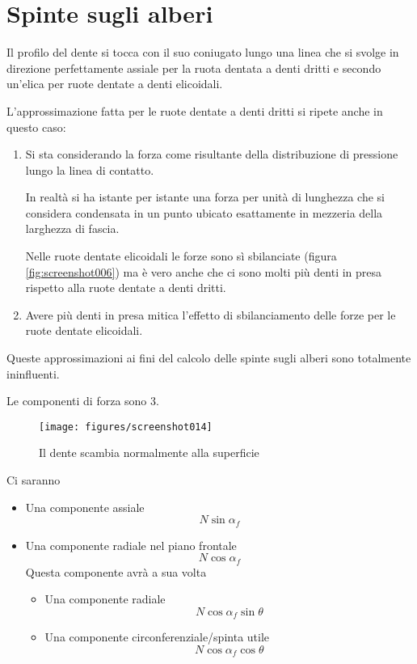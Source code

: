 \documentclass[a4paper, 15pt]{article}
\begin{document}
\section{Spinte sugli alberi}
\begin{adjustwidth}{2in}{}	
	Il profilo del dente si tocca con il suo coniugato lungo una linea che si svolge in direzione perfettamente assiale per la ruota dentata a denti dritti e secondo un'elica per ruote dentate a denti elicoidali. 
	
	L'approssimazione fatta per le ruote dentate a denti dritti si ripete anche in questo caso:
	\begin{enumerate}
		\item Si sta considerando la forza come risultante della distribuzione di pressione lungo la linea di contatto.
		
		In realtà si ha istante per istante una forza per unità di lunghezza che si considera condensata in un punto ubicato esattamente in mezzeria della larghezza di fascia. \newline 
		
		Nelle ruote dentate elicoidali le forze sono sì sbilanciate (figura \ref{fig:screenshot006}) ma è vero anche che ci sono molti più denti in presa rispetto alla ruote dentate a denti dritti. 
		
		\item Avere più denti in presa mitica l'effetto di sbilanciamento delle forze per le ruote dentate elicoidali. 		
	\end{enumerate}
	Queste approssimazioni ai fini del calcolo delle spinte sugli alberi sono totalmente ininfluenti. \newline 
	
	Le componenti di forza sono 3. 
	\begin{figure}[H]
		\centering
		\texttt{[image: figures/screenshot014]}
		\caption{Il dente scambia normalmente alla superficie}
		\label{fig:screenshot014}
	\end{figure}
	Ci saranno
	\begin{itemize}
		\item Una componente assiale
		\[N\sin\alpha_f\]
		\item Una componente radiale nel piano frontale 
		\[N\cos\alpha_f\]
		Questa componente avrà a sua volta 
		\begin{itemize}
			\item Una componente radiale 
			\[N\cos\alpha_f\sin\theta\]
			\item Una componente circonferenziale/spinta utile
			\[N\cos\alpha_f\cos\theta\]
		\end{itemize}
		

\end{itemize}
\end{adjustwidth}
\end{document}
